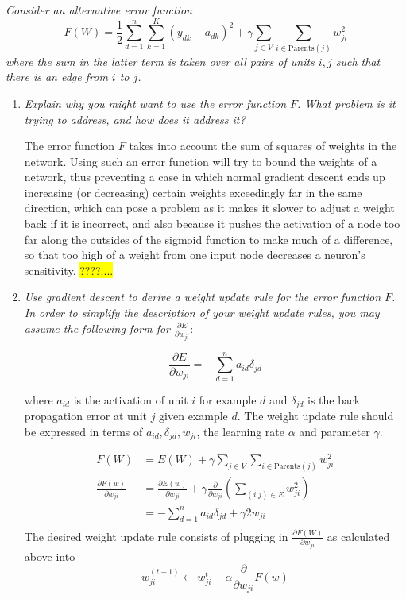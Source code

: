 \documentclass{article}
\newcommand{\edit}[1]{\colorbox{Yellow}{#1}}
\newcommand{\dee}[2]{\frac{\partial{#1}}{\partial{#2}}}
\begin{document}
  \textit{Consider an alternative error function}
  \[F(W)=\frac12\sum_{d=1}^n\sum_{k=1}^K(y_{dk}-a_{dk})^2+\gamma\sum_{j\in V}\sum_{i\in\text{Parents}(j)}w_{ji}^2\]
  \textit{where the sum in the latter term is taken over all pairs of
    units $i,j$ such that there is an edge from $i$ to $j$.}

  \begin{enumerate}
  \item \textit{Explain why you might want to use the error function
    $F$. What problem is it trying to address, and how does it address
    it?}

    The error function $F$ takes into account the sum of squares of weights
    in the network. Using such an error function will try to bound the
    weights of a network, thus preventing a case in which normal gradient
    descent ends up increasing (or decreasing) certain weights exceedingly far
    in the same direction, which can pose a problem as it makes it 
    slower to adjust a weight back if it is incorrect, and also because it pushes
    the activation of a node too far along the outsides of the sigmoid
    function to make much of a difference, so that too high of a weight
    from one input node decreases a neuron's sensitivity. 
    \edit{????....}

  \item \textit{Use gradient descent to derive a weight update rule
    for the error function $F$. In order to simplify the description
    of your weight update rules, you may assume the following form for
    $\frac{\partial E}{\partial w_{ji}}$}:

    \[\frac{\partial E}{\partial w_{ji}} = -\sum_{d=1}^n a_{id}\delta_{jd}\]

    where $a_{id}$ is the activation of unit $i$ for example $d$ and
    $\delta_{jd}$ is the back propagation error at unit $j$ given
    example $d$. The weight update rule should be expressed in terms
    of $a_{id},\delta_{jd},w_{ji}$, the learning rate $\alpha$ and
    parameter $\gamma$.

    \begin{align*}
      F(W) & = E(W)+\gamma\sum_{j\in V}\sum_{i\in \text{Parents}(j)} w_{ji}^2 \\
      \dee{F(w)}{w_{ji}} & = \dee{E(w)}{w_{ji}} + \gamma \dee{}{w_{ji}} \left( \sum_{(i.j)\in E} w_{ji}^2\right) \\
      & = -\sum_{d=1}^n a_{id} \delta_{jd}+ \gamma 2w_{ji}\\
    \end{align*}
    The desired weight update rule consists of plugging in $\dee{F(W)}{w_{ji}}$ as calculated
    above into 
    $$w_{ji}^{(t+1)}\leftarrow w_{ji}^t-\alpha \dee{}{w_{ji}} F(w)$$
  \end{enumerate}
\end{document}
